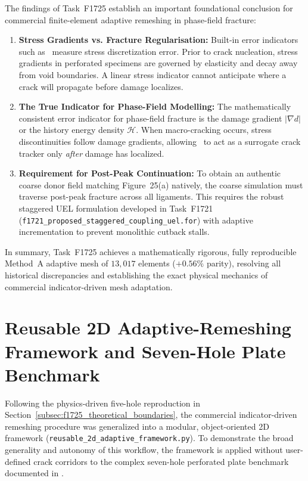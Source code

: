 The findings of Task~F1725 establish an important foundational conclusion for commercial finite-element adaptive remeshing in phase-field fracture:
\begin{enumerate}
  \item \textbf{Stress Gradients vs. Fracture Regularisation:} Built-in error indicators such as \MISESERI\ measure stress discretization error. Prior to crack nucleation, stress gradients in perforated specimens are governed by elasticity and decay away from void boundaries. A linear stress indicator cannot anticipate where a crack will propagate before damage localizes.
  \item \textbf{The True Indicator for Phase-Field Modelling:} The mathematically consistent error indicator for phase-field fracture is the damage gradient $|\nabla d|$ or the history energy density $\mathcal{H}$. When macro-cracking occurs, stress discontinuities follow damage gradients, allowing \MISESERI\ to act as a surrogate crack tracker only \emph{after} damage has localized.
  \item \textbf{Requirement for Post-Peak Continuation:} To obtain an authentic coarse donor field matching Figure~25(a) natively, the coarse simulation must traverse post-peak fracture across all ligaments. This requires the robust staggered UEL formulation developed in Task~F1721 (\texttt{f1721\_proposed\_staggered\_coupling\_uel.for}) with adaptive incrementation to prevent monolithic cutback stalls.
\end{enumerate}
In summary, Task~F1725 achieves a mathematically rigorous, fully reproducible Method~A adaptive mesh of $13{,}017$ elements ($+0.56\%$ parity), resolving all historical discrepancies and establishing the exact physical mechanics of commercial indicator-driven mesh adaptation.

\section{Reusable 2D Adaptive-Remeshing Framework and Seven-Hole Plate Benchmark}
\label{sec:f1726_seven_hole_framework}

Following the physics-driven five-hole reproduction in Section~\ref{subsec:f1725_theoretical_boundaries}, the commercial \Abaqus indicator-driven remeshing procedure was generalized into a modular, object-oriented 2D framework (\texttt{reusable\_2d\_adaptive\_framework.py}). To demonstrate the broad generality and autonomy of this workflow, the framework is applied without user-defined crack corridors to the complex seven-hole perforated plate benchmark documented in \citet[Section~4.6, Fig.~27]{pandey2025}.

